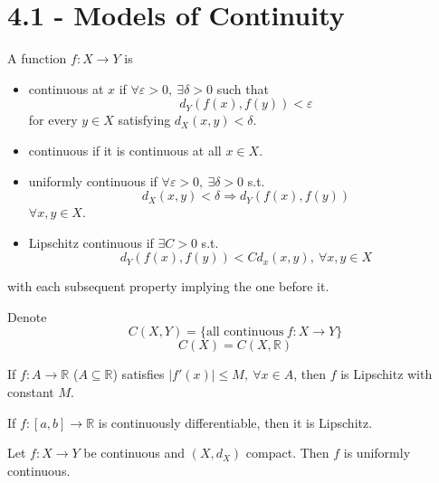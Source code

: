 \section{4.1 - Models of Continuity}
\begin{defn}
    A function $f : X \to Y$ is 
    \begin{itemize}
        \item continuous at $x$ if $\forall \varepsilon > 0, \:
            \exists \delta > 0$ such that 
            \[
                d_Y(f(x), f(y)) < \varepsilon
            \]
            for every $y \in X$ satisfying $d_X(x,y) < \delta$.
        \item continuous if it is continuous at all 
            $x \in X$.
        \item uniformly continuous if 
            $\forall \varepsilon > 0, \: \exists \delta > 0$ s.t. 
            \[
                d_X(x,y) < \delta \Rightarrow d_Y(f(x),f(y))
            \]
            $\forall x,y \in X$.
        \item Lipschitz continuous if $\exists C > 0$ s.t. 
            \[
                d_Y(f(x),f(y)) < C d_x(x,y), \ \forall x,y \in X
            \]
    \end{itemize}
    with each subsequent property implying the one before it. 
\end{defn}
\begin{defn}
    Denote 
    \[
        C(X,Y) = \{\text{all continuous} \ f:X\to Y\}
    \]
    \[
        C(X) = C(X,\mathbb R)
    \]
\end{defn}
\begin{lem}
    If $f:A \to \mathbb R$ ($A \subseteq \mathbb R$) satisfies 
    $|f'(x)| \leq M, \: \forall x \in A$, then $f$ is 
    Lipschitz with constant $M$.
\end{lem}
\begin{lem}
    If $f : [a,b] \to \mathbb R$ is continuously differentiable, 
    then it is Lipschitz.
\end{lem}
\begin{thm}
    Let $f : X \to Y$ be continuous and $(X,d_X)$ compact. 
    Then $f$ is uniformly continuous.
\end{thm}

\newpage 
